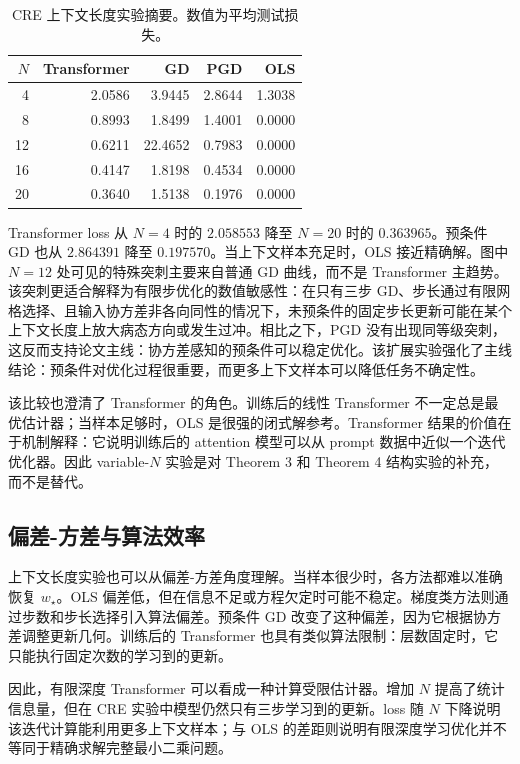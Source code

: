 \documentclass[conference]{IEEEtran}
\newcommand{\wstar}{w_\star}
\begin{document}
\begin{table}[!t]
\centering
\caption{CRE 上下文长度实验摘要。数值为平均测试损失。}
\label{tab:variable_n}
\begin{tabular}{rrrrr}
\toprule
$N$ & Transformer & GD & PGD & OLS\\
\midrule
4 & 2.0586 & 3.9445 & 2.8644 & 1.3038\\
8 & 0.8993 & 1.8499 & 1.4001 & 0.0000\\
12 & 0.6211 & 22.4652 & 0.7983 & 0.0000\\
16 & 0.4147 & 1.8198 & 0.4534 & 0.0000\\
20 & 0.3640 & 1.5138 & 0.1976 & 0.0000\\
\bottomrule
\end{tabular}
\end{table}

Transformer loss 从 $N=4$ 时的 $2.058553$ 降至 $N=20$ 时的 $0.363965$。预条件 GD 也从 $2.864391$ 降至 $0.197570$。当上下文样本充足时，OLS 接近精确解。图中 $N=12$ 处可见的特殊突刺主要来自普通 GD 曲线，而不是 Transformer 主趋势。该突刺更适合解释为有限步优化的数值敏感性：在只有三步 GD、步长通过有限网格选择、且输入协方差非各向同性的情况下，未预条件的固定步长更新可能在某个上下文长度上放大病态方向或发生过冲。相比之下，PGD 没有出现同等级突刺，这反而支持论文主线：协方差感知的预条件可以稳定优化。该扩展实验强化了主线结论：预条件对优化过程很重要，而更多上下文样本可以降低任务不确定性。

该比较也澄清了 Transformer 的角色。训练后的线性 Transformer 不一定总是最优估计器；当样本足够时，OLS 是很强的闭式解参考。Transformer 结果的价值在于机制解释：它说明训练后的 attention 模型可以从 prompt 数据中近似一个迭代优化器。因此 variable-$N$ 实验是对 Theorem 3 和 Theorem 4 结构实验的补充，而不是替代。

\subsection{偏差-方差与算法效率}
上下文长度实验也可以从偏差-方差角度理解。当样本很少时，各方法都难以准确恢复 $\wstar$。OLS 偏差低，但在信息不足或方程欠定时可能不稳定。梯度类方法则通过步数和步长选择引入算法偏差。预条件 GD 改变了这种偏差，因为它根据协方差调整更新几何。训练后的 Transformer 也具有类似算法限制：层数固定时，它只能执行固定次数的学习到的更新。

因此，有限深度 Transformer 可以看成一种计算受限估计器。增加 $N$ 提高了统计信息量，但在 CRE 实验中模型仍然只有三步学习到的更新。loss 随 $N$ 下降说明该迭代计算能利用更多上下文样本；与 OLS 的差距则说明有限深度学习优化并不等同于精确求解完整最小二乘问题。
\end{document}
